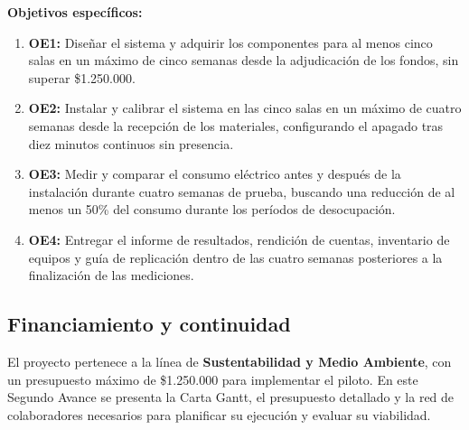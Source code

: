 \noindent\textbf{Objetivos específicos:}
\begin{enumerate}
    \item \textbf{OE1:} Diseñar el sistema y adquirir los componentes para al menos cinco salas en un máximo de cinco semanas desde la adjudicación de los fondos, sin superar \$1.250.000.

    \item \textbf{OE2:} Instalar y calibrar el sistema en las cinco salas en un máximo de cuatro semanas desde la recepción de los materiales, configurando el apagado tras diez minutos continuos sin presencia.

    \item \textbf{OE3:} Medir y comparar el consumo eléctrico antes y después de la instalación durante cuatro semanas de prueba, buscando una reducción de al menos un 50\% del consumo durante los períodos de desocupación.

    \item \textbf{OE4:} Entregar el informe de resultados, rendición de cuentas, inventario de equipos y guía de replicación dentro de las cuatro semanas posteriores a la finalización de las mediciones.
\end{enumerate}

\subsection{Financiamiento y continuidad}

El proyecto pertenece a la línea de \textbf{Sustentabilidad y Medio Ambiente}, con un presupuesto máximo de \$1.250.000 para implementar el piloto. En este Segundo Avance se presenta la Carta Gantt, el presupuesto detallado y la red de colaboradores necesarios para planificar su ejecución y evaluar su viabilidad.

